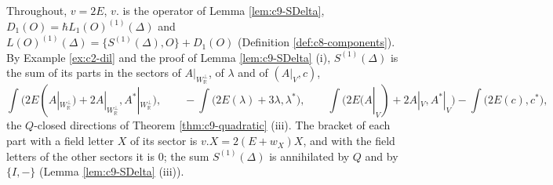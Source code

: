 Throughout, $v=2E$, $v.$ is the operator of Lemma \ref{lem:c9-SDelta}, $D_1(O)=\hbar L_1(O)^{(1)}(\Delta)$ and $L(O)^{(1)}(\Delta)=\{S^{(1)}(\Delta),O\}+D_1(O)$ (Definition \ref{def:c8-components}). By Example \ref{ex:c2-dil} and the proof of Lemma \ref{lem:c9-SDelta} (i), $S^{(1)}(\Delta)$ is the sum of its parts in the sectors of $A|_{W_{\mathbb R}^\perp}$, of $\lambda$ and of $(A|_V,c)$,
\[
\int\big(2E(A|_{W_{\mathbb R}^\perp})+2A|_{W_{\mathbb R}^\perp},A^*|_{W_{\mathbb R}^\perp}\big),\qquad -\int\big(2E(\lambda)+3\lambda,\lambda^*\big),\qquad \int\big(2E(A|_V)+2A|_V,A^*|_V\big)-\int\big(2E(c),c^*\big),
\]
the $Q$-closed directions of Theorem \ref{thm:c9-quadratic} (iii). The bracket of each part with a field letter $X$ of its sector is $v.X=2(E+w_X)X$, and with the field letters of the other sectors it is $0$; the sum $S^{(1)}(\Delta)$ is annihilated by $Q$ and by $\{I,-\}$ (Lemma \ref{lem:c9-SDelta} (iii)).

